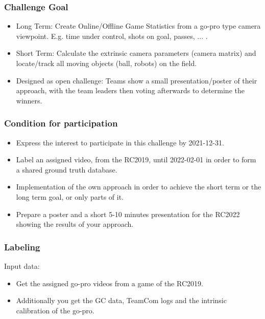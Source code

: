     \subsubsection{Challenge Goal}
    \begin{itemize}
        \item Long Term: Create Online/Offline Game Statistics from a go-pro type camera viewpoint. E.g. time under control, shots on goal, passes, ... .
        \item Short Term: Calculate the extrinsic camera parameters (camera matrix) and locate/track all moving objects (ball, robots) on the field.
        \item Designed as open challenge: Teams show a small presentation/poster of their approach, with the team leaders then voting afterwards to determine the winners.
    \end{itemize}

    \subsubsection{Condition for participation}
        \begin{itemize}
            \item Express the interest to participate in this challenge by 2021-12-31.
            \item Label an assigned video, from the RC2019, until 2022-02-01  in order to form a shared ground truth database.
            \item Implementation of the own approach in order to achieve the short term or the long term goal, or only parts of it.
            \item Prepare a poster and a short 5-10 minutes presentation for the RC2022 showing the results of your approach.
        \end{itemize}
    
    \subsubsection{Labeling}
        Input data:
        \begin{itemize}
            \item Get the assigned go-pro videos from a game of the RC2019.
            \item Additionally you get the GC data, TeamCom logs and the intrinsic calibration of the go-pro.
        \end{itemize}

